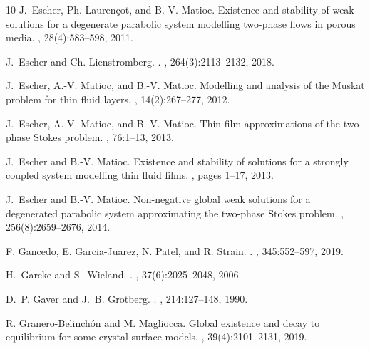 \documentclass[reqno,11pt]{amsart}
\begin{document}
{\begin{thebibliography}{10}
J.~Escher, Ph. Lauren\c{c}ot, and B.-V. Matioc.
\newblock Existence and stability of weak solutions for a degenerate parabolic
  system modelling two-phase flows in porous media.
, 28(4):583--598,
  2011.

J.~Escher and Ch. Lienstromberg.
.
, 264(3):2113--2132, 2018.

J.~Escher, A.-V. Matioc, and B.-V. Matioc.
\newblock Modelling and analysis of the {M}uskat problem for thin fluid layers.
, 14(2):267--277, 2012.

J.~Escher, A.-V. Matioc, and B.-V. Matioc.
\newblock Thin-film approximations of the two-phase {S}tokes problem.
, 76:1--13,
  2013.

J.~Escher and B.-V. Matioc.
\newblock Existence and stability of solutions for a strongly coupled system
  modelling thin fluid films.
, pages
  1--17, 2013.

J.~Escher and B.-V. Matioc.
\newblock Non-negative global weak solutions for a degenerated parabolic system
  approximating the two-phase {S}tokes problem.
, 256(8):2659--2676, 2014.

F. Gancedo, E. Garcia-Juarez, N. Patel, and R. Strain.
.
, 345:552--597, 2019.

H.~Garcke and S.~Wieland.
.
, 37(6):2025--2048, 2006.

D.~P. Gaver and J.~B. Grotberg.
.
, 214:127--148, 1990.

R. Granero-Belinch{\'o}n and M. Magliocca.
\newblock Global existence and decay to equilibrium for some crystal surface
  models.
, 39(4):2101--2131,
  2019.


\end{thebibliography}}
\end{document}
